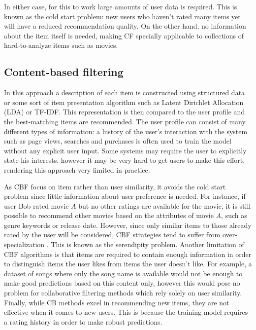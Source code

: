 \documentclass[cic,tc,english]{iiufrgs}
\begin{document}
In either case, for this to work large amounts of user data is required. This is known as the cold start problem: new users who haven't rated many items yet will have a reduced recommendation quality. On the other hand, no information about the item itself is needed, making CF specially applicable to collections of hard-to-analyze items such as movies.

\subsection{Content-based filtering}
In this approach a description of each item is constructed using structured data or some sort of item presentation algorithm such as Latent Dirichlet Allocation (LDA) or TF-IDF. This representation is then compared to the user profile and the best-matching items are recommended. The user profile can consist of many different types of information: a history of the user's interaction with the system such as page views, searches and purchases is often used to train the model without any explicit user input. Some systems may require the user to explicitly state his interests, however it may be very hard to get users to make this effort, rendering this approach very limited in practice.

As CBF focus on item rather than user similarity, it avoids the cold start problem since little information about user preference is needed. For instance, if user Bob rated movie $A$ but no other ratings are available for the movie, it is still possible to recommend other movies based on the attributes of movie $A$, such as genre keywords or release date. However, since only similar items to those already rated by the user will be considered, CBF strategies tend to suffer from over-specialization \cite{Iaquinta2008}. This is known as the serendipity problem. Another limitation of CBF algorithms is that items are required to contain enough information in order to distinguish items the user likes from items the user doesn't like. For example, a dataset of songs where only the song name is available would not be enough to make good predictions based on this content only, however this would pose no problem for collaborative filtering methods which rely solely on user similarity. Finally, while CB methods excel in recommending new items, they are not effective when it comes to new users. This is because the training model requires a rating history in order to make robust predictions.
\end{document}
